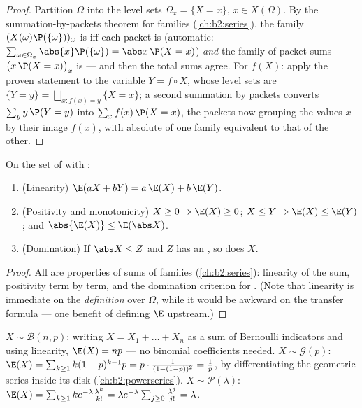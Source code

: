 \begin{proof}
Partition $\Omega$ into the level sets $\Omega_x = \{X = x\}$, $x
\in X(\Omega)$. By the summation-by-packets theorem for 
families (\cref{ch:b2:series}), the family
$(X(\omega)\P(\{\omega\}))_\omega$ is  iff each packet is
(automatic: $\sum_{\omega \in \Omega_x}\abs{x}\P(\{\omega\}) =
\abs x\,\P(X = x)$) \emph{and} the family of packet sums
$\bigl(x\,\P(X = x)\bigr)_x$ is  --- and then the total
sums agree. For $f(X)$: apply the proven statement to the variable $Y =
f \circ X$, whose level sets are $\{Y = y\} =
\bigsqcup_{x : f(x) = y}\{X = x\}$; a second summation by
packets converts $\sum_y y\,\P(Y = y)$ into $\sum_x
f(x)\,\P(X = x)$, the packets now grouping the values $x$
by their image $f(x)$, with absolute  of one
family equivalent to that of the other.
\end{proof}

\begin{theorem}\label{thm:b2:randomvar:linearity}
On the set of  with :
\begin{enumerate}
\item (Linearity) $\E(aX + bY) = a\,\E(X) + b\,\E(Y)$.
\item (Positivity and monotonicity) $X \geq 0 \Rightarrow \E(X)
\geq 0$; $X \leq Y \Rightarrow \E(X) \leq \E(Y)$; and
$\abs{\E(X)} \leq \E(\abs X)$.
\item (Domination) If $\abs X \leq Z$ and $Z$ has an ,
so does $X$.
\end{enumerate}
\end{theorem}

\begin{proof}
All are properties of sums of  families
(\cref{ch:b2:series}): linearity of the sum, positivity term by
term, and the domination criterion for . (Note that
linearity is immediate on the \emph{definition} over $\Omega$,
while it would be awkward on the transfer formula --- one benefit
of defining $\E$ upstream.)
\end{proof}

\begin{example}\label{ex:b2:randomvar:expectations}
$X \sim \mathcal{B}(n, p)$: writing $X = X_1 + \dots + X_n$ as a
sum of Bernoulli indicators and using linearity, $\E(X) = np$ ---
no binomial coefficients needed. $X \sim \mathcal{G}(p)$: $\E(X) =
\sum_{k\geq1}k(1-p)^{k-1}p = p\cdot\frac{1}{(1 - (1-p))^2} =
\frac1p$, by differentiating the geometric series inside its disk
(\cref{ch:b2:powerseries}). $X \sim \mathcal{P}(\lambda)$: $\E(X)
= \sum_{k\geq1}k e^{-\lambda}\frac{\lambda^k}{k!} = \lambda
e^{-\lambda}\sum_{j\geq0}\frac{\lambda^j}{j!} = \lambda$.
\end{example}

